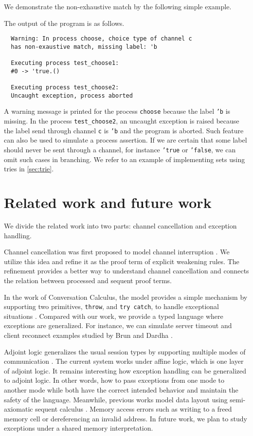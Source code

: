 \documentclass[12pt, openany]{memoir}
\begin{document}
We demonstrate the non-exhaustive match by the following simple example.

The output of the program is as follows.
\begin{verbatim}
  Warning: In process choose, choice type of channel c
  has non-exaustive match, missing label: 'b
  
  Executing process test_choose1:
  #0 -> 'true.()

  Executing process test_choose2:
  Uncaught exception, process aborted
\end{verbatim}
A warning message is printed for the process \texttt{choose} because the label \texttt{'b} is missing.
In the process \texttt{test\_choose2}, an uncaught exception is raised because the label send through channel \texttt{c} is \texttt{'b}
and the program is aborted. Such feature can also be used to simulate a process assertion. 
If we are certain that some label should never be sent through a channel, for instance \texttt{'true} or \texttt{'false},
we can omit such cases in branching. We refer to an example of implementing sets using tries in \cref{sec:trie}.
\section{Related work and future work}
We divide the related work into two parts: channel cancellation and exception handling.

Channel cancellation was first proposed to model channel interruption \cite{Mos2014}.
We utilize this idea and refine it as the proof term of explicit weakening rules.
The refinement provides a better way to understand channel cancellation
and connects the relation between processed and sequent proof terms.

In the work of Conversation Calculus, the model provides a simple mechanism by supporting two primitives, \texttt{throw},
and \texttt{try catch}, to handle exceptional situations \cite{Vieira2008}. Compared with our work,
we provide a typed language where exceptions are generalized. For instance,
we can simulate server timeout and client reconnect examples studied by Brun and Dardha \cite{Brun2023}.

Adjoint logic generalizes the usual session types by supporting multiple modes of communication \cite{Klaas2019}.
The current system works under affine logic, which is one layer of adjoint logic.
It remains interesting how exception handling can be generalized to adjoint logic.
In other words, how to pass exceptions from one mode to another mode while both have the correct intended behavior and
maintain the safety of the language. Meanwhile, previous works model data layout using
semi-axiomatic sequent calculus \cite{DeYoung2023}. Memory access errors such as
writing to a freed memory cell or dereferencing an invalid address. In future work,
we plan to study exceptions under a shared memory interpretation.
\end{document}
